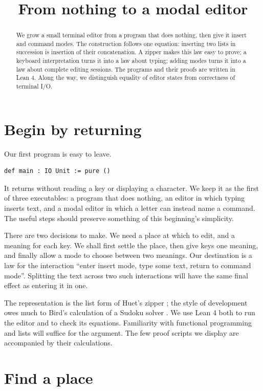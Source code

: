 \documentclass[11pt]{article}
\title{From nothing to a modal editor}
\author{}
\date{}
\begin{document}
\maketitle
\vspace{-3.5em}
\begin{abstract}
We grow a small terminal editor from a program that does nothing, then give it
insert and command modes. The construction follows one equation: inserting two
lists in succession is insertion of their concatenation. A zipper makes this
law easy to prove; a keyboard interpretation turns it into a law about typing;
adding modes turns it into a law about complete editing sessions. The programs
and their proofs are written in Lean 4. Along the way, we distinguish equality
of editor states from correctness of terminal I/O.
\end{abstract}

\section{Begin by returning}

Our first program is easy to leave.
\begin{lstlisting}[language=Lean]
def main : IO Unit := pure ()
\end{lstlisting}
It returns without reading a key or displaying a character. We keep it as the
first of three executables: a program that does nothing, an editor in which
typing inserts text, and a modal editor in which a letter can instead name a
command. The useful steps should preserve something of this beginning's
simplicity.

There are two decisions to make. We need a place at which to edit, and a meaning
for each key. We shall first settle the place, then give keys one meaning, and
finally allow a mode to choose between two meanings. Our destination is a law
for the interaction ``enter insert mode, type some text, return to command
mode''. Splitting the text across two such interactions will have the same
final effect as entering it in one.

The representation is the list form of Huet's zipper
\citep{huet1997}; the style of development owes much to Bird's calculation of a
Sudoku solver \citep{bird2006}. We use Lean 4 \citep{demoura2021} both to run
the editor and to check its equations. Familiarity with functional programming
and lists will suffice for the argument. The few proof scripts we display are
accompanied by their calculations.

\section{Find a place}
\label{sec:place}
\end{document}
